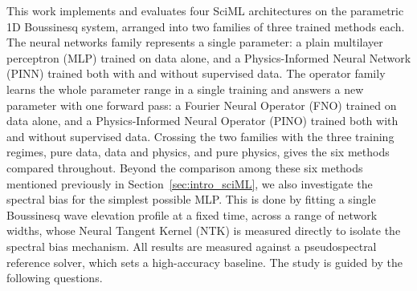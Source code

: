 This work implements and evaluates four SciML architectures on the parametric 1D Boussinesq system, arranged into two families of three trained methods each. The neural networks family represents a single parameter: a plain multilayer perceptron (MLP) trained on data alone, and a Physics-Informed Neural Network (PINN) trained both with and without supervised data. The operator family learns the whole parameter range in a single training and answers a new parameter with one forward pass: a Fourier Neural Operator (FNO) trained on data alone, and a Physics-Informed Neural Operator (PINO) trained both with and without supervised data. Crossing the two families with the three training regimes, pure data, data and physics, and pure physics, gives the six methods compared throughout. Beyond the comparison among these six methods mentioned previously in Section~\ref{sec:intro_sciML}, we also investigate the spectral bias for the simplest possible MLP. This is done by fitting a single Boussinesq wave elevation profile at a fixed time, across a range of network widths, whose Neural Tangent Kernel (NTK) is measured directly to isolate the spectral bias mechanism. All results are measured against a pseudospectral reference solver, which sets a high-accuracy baseline. The study is guided by the following questions.

